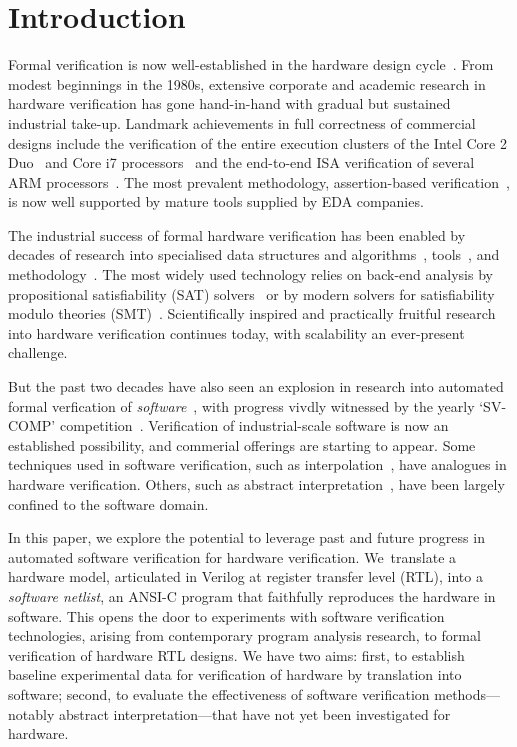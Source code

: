 \section{Introduction}\label{sec:intro}

Formal verification is now well-established in the hardware design
cycle~\cite{Seligman:2015:FV}.  From modest beginnings in the 1980s,
extensive corporate and academic research in hardware verification has gone
hand-in-hand with gradual but sustained industrial take-up.  Landmark
achievements in full correctness of commercial designs include the
verification of the entire execution clusters of the Intel Core 2
Duo~\cite{Core2} and Core i7 processors~\cite{i7} and the end-to-end ISA
verification of several ARM processors~\cite{ARM}.  The most prevalent
methodology, assertion-based verification~\cite{Foster:2009:AAB}, is now
well supported by mature tools supplied by EDA companies.

The industrial success of formal hardware verification has been enabled by
decades of research into specialised data structures and
algorithms~\cite{ic3, fmcad2000, ken, biere, STE},
tools~\cite{Seger:2005:IEE, abc, ebmc, vis, cadence, synopsysfv}, and
methodology~\cite{MCMILLAN2000279, Aagaard:2000:MLH, uclid, word-term,
word-bmc, DBLP:conf/lpar/AndrausLS08}.  The most widely used technology
relies on back-end analysis by propositional satisfiability (SAT)
solvers~\cite{Biere1999} or by modern solvers for satisfiability modulo
theories (SMT)~\cite{decision_procedures,
DBLP:conf/lpar/AndrausLS08,soc-keating,
DBLP:conf/mtv/SunkariCVM07,DBLP:conf/cav/Bjesse08}.  Scientifically inspired
and practically fruitful research into hardware verification continues
today, with scalability an ever-present challenge.

But the past two decades have also seen an explosion in research into
automated formal verfication of \emph{software}~\cite{dkw2008}, with
progress vivdly witnessed by the yearly `SV-COMP'
competition~\cite{Beyer2017}.  Verification of industrial-scale software is
now an established possibility, and commerial offerings are starting to
appear.  Some techniques used in software verification, such as
interpolation~\cite{Interpolants, Kroening:2011:ISV}, have analogues in
hardware verification.  Others, such as abstract
interpretation~\cite{CousotCousot77, Cousot:1996:AI}, have been largely
confined to the software domain.

In this paper, we explore the potential to leverage past and future progress
in automated software verification for hardware verification.  We~translate
a hardware model, articulated in Verilog at register transfer level (RTL),
into a \emph{software netlist}, an ANSI-C program that faithfully reproduces
the hardware in software.  This opens the door to experiments with software
verification technologies, arising from contemporary program analysis
research, to formal verification of hardware RTL designs.  We have two aims:
first, to establish baseline experimental data for verification of hardware
by translation into software; second, to evaluate the effectiveness of
software verification methods---notably abstract interpretation---that have
not yet been investigated for hardware.

